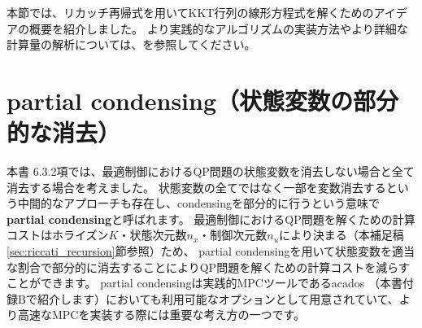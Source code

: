 \documentclass[a4paper]{jarticle}
\begin{document}
本節では、リカッチ再帰式を用いてKKT行列の線形方程式を解くためのアイデアの概要を紹介しました。
より実践的なアルゴリズムの実装方法やより詳細な計算量の解析については、\cite{frison2015algorithms}を参照してください。


\clearpage
\section{partial condensing（状態変数の部分的な消去）}

本書\cite{fukatsu2024python} 6.3.2項では、最適制御におけるQP問題の状態変数を消去しない場合と全て消去する場合を考えました。
状態変数の全てではなく一部を変数消去するという中間的なアプローチも存在し、condensingを部分的に行うという意味で\textbf{partial condensing}と呼ばれます\cite{axehill2015controlling,frison2015algorithms}。
最適制御におけるQP問題を解くための計算コストはホライズン$K$・状態次元数$n_x$・制御次元数$n_u$により決まる（本補足稿\ref{sec:riccati_recursion}節参照）ため、
partial condensingを用いて状態変数を適当な割合で部分的に消去することによりQP問題を解くための計算コストを減らすことができます。
partial condensingは実践的MPCツールであるacados \cite{verschueren2021acados}（本書\cite{fukatsu2024python}付録Bで紹介します）においても利用可能なオプションとして用意されていて、より高速なMPCを実装する際には重要な考え方の一つです。
\end{document}
